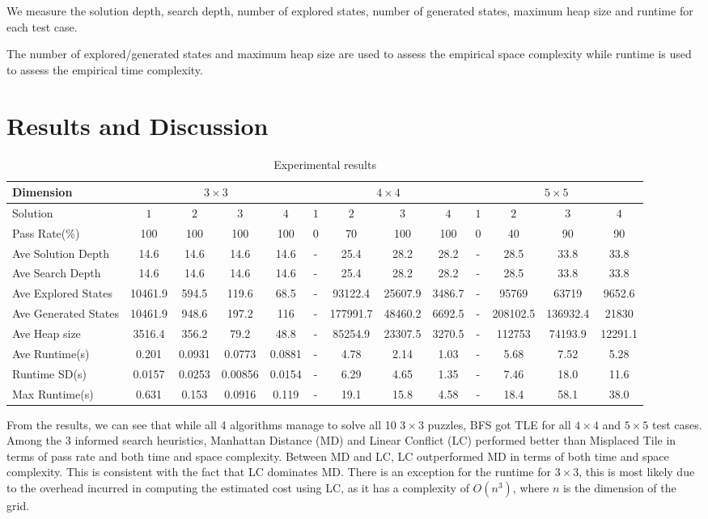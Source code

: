 \documentclass{llncs}
\begin{document}
We measure the solution depth, search depth, number of explored states, number of generated states, maximum heap size and runtime for each test case.

The number of explored/generated states and maximum heap size are used to assess the empirical space complexity while runtime is used to assess the empirical time complexity.

\section{Results and Discussion}
\begin{table}
	\centering
	\begin{tabular}{l|c|c|c|c|c|c|c|c|c|c|c|c} \hline
		Dimension & \multicolumn{4}{c|}{$3 \times 3$} & \multicolumn{4}{c|}{$4 \times 4$} & \multicolumn{4}{c}{$5 \times 5$} \\\hline
		Solution & $1$ & $2$ & $3$ & $4$ & $1$ & $2$ & $3$ & $4$ & $1$ & $2$ & $3$ & $4$ \\\hline
		Pass Rate(\%) & 100 & 100 & 100 & 100 & 0 & 70 & 100 & 100 & 0 & 40 & 90 & 90 \\\hline
		Ave Solution Depth & 14.6 & 14.6 & 14.6 & 14.6 & - & 25.4 & 28.2 & 28.2 & - & 28.5 & 33.8 & 33.8 \\\hline
		Ave Search Depth & 14.6 & 14.6 & 14.6 & 14.6 & - & 25.4 & 28.2 & 28.2 & - & 28.5 & 33.8 & 33.8 \\\hline
		Ave Explored States & 10461.9 & 594.5 & 119.6 & 68.5 & - & 93122.4 & 25607.9 & 3486.7 & - & 95769 & 63719 & 9652.6 \\\hline
		Ave Generated States & 10461.9 & 948.6 & 197.2 & 116 & - & 177991.7 & 48460.2 & 6692.5 & - & 208102.5 & 136932.4 & 21830 \\\hline
		Ave Heap size & 3516.4 & 356.2 & 79.2 & 48.8 & - & 85254.9 & 23307.5 & 3270.5 & - & 112753 & 74193.9 & 12291.1 \\\hline
		Ave Runtime(s) & 0.201 & 0.0931 & 0.0773 & 0.0881 & - & 4.78 & 2.14 & 1.03 & - & 5.68 & 7.52 & 5.28 \\\hline
		Runtime SD(s) & 0.0157 & 0.0253 & 0.00856 & 0.0154 & - & 6.29 & 4.65 & 1.35 & - & 7.46 & 18.0 & 11.6 \\\hline
		Max Runtime(s) & 0.631 & 0.153 & 0.0916 & 0.119 & - & 19.1 & 15.8 & 4.58 & - & 18.4 & 58.1 & 38.0 \\\hline
	\end{tabular}
	\caption{Experimental results}
	\label{tab:one}
\end{table}
From the results, we can see that while all 4 algorithms manage to solve all 10 $3 \times 3$ puzzles, BFS got TLE for all $4 \times 4$ and $5 \times 5$ test cases. Among the 3 informed search heuristics, Manhattan Distance (MD) and Linear Conflict (LC) performed better than Misplaced Tile in terms of pass rate and both time and space complexity. Between MD and LC, LC outperformed MD in terms of both time and space complexity. This is consistent with the fact that LC dominates MD. There is an exception for the runtime for $3 \times 3$, this is most likely due to the overhead incurred in computing the estimated cost using LC, as it has a complexity of $O(n^3)$, where $n$ is the dimension of the grid.
\end{document}
